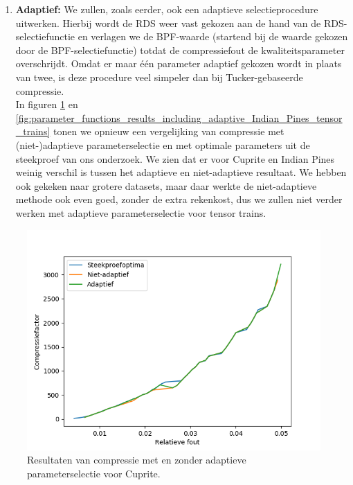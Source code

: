 \begin{enumerate}
\begin{enumerate}
\item \textbf{Adaptief:} We zullen, zoals eerder, ook een adaptieve selectieprocedure uitwerken. Hierbij wordt de RDS weer vast gekozen aan de hand van de RDS-selectiefunctie en verlagen we de BPF-waarde (startend bij de waarde gekozen door de BPF-selectiefunctie) totdat de compressiefout de kwaliteitsparameter overschrijdt. Omdat er maar \'e\'en parameter adaptief gekozen wordt in plaats van twee, is deze procedure veel simpeler dan bij Tucker-gebaseerde compressie.\\

In figuren \ref{fig:parameter_functions_results_including_adaptive_Cuprite_tensor_trains} en \ref{fig:parameter_functions_results_including_adaptive_Indian_Pines_tensor_trains} tonen we opnieuw een vergelijking van compressie met (niet-)adaptieve parameterselectie en met optimale parameters uit de steekproef van ons onderzoek. We zien dat er voor Cuprite en Indian Pines weinig verschil is tussen het adaptieve en niet-adaptieve resultaat. We hebben ook gekeken naar grotere datasets, maar daar werkte de niet-adaptieve methode ook even goed, zonder de extra rekenkost, dus we zullen niet verder werken met adaptieve parameterselectie voor tensor trains.

\end{enumerate}
\end{enumerate}

\newpage
\begin{figure}[H]
  \centering
  \includegraphics[scale=0.7]{images/parameter_functions_results_including_adaptive_Cuprite_tensor_trains.png}
  \caption{Resultaten van compressie met en zonder adaptieve parameterselectie voor Cuprite.}
  \label{fig:parameter_functions_results_including_adaptive_Cuprite_tensor_trains}
\end{figure}

